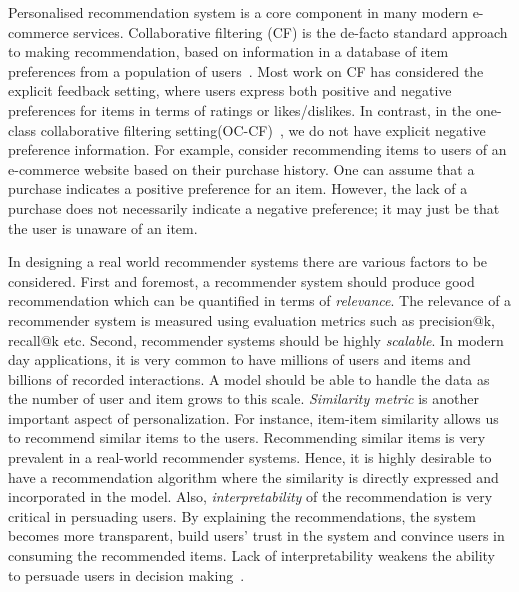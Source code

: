 Personalised recommendation system is a core component
in many modern e-commerce services. Collaborative
filtering (CF) is the de-facto standard approach to making recommendation,
based on information in a database
of item preferences from a population of users~\citep{Goldberg:1992}. Most work on CF has considered 
the explicit feedback
setting, where users express both positive and negative preferences
for items in terms of ratings or likes/dislikes. In
contrast, in the one-class collaborative filtering setting(OC-CF)~\citep{Pan:2008}, we do not have
explicit negative preference information. For example, consider
recommending items to users of an e-commerce website
based on their purchase history. One can assume that a
purchase indicates a positive preference for an item. However,
the lack of a purchase does not necessarily indicate
a negative preference; it may just be that the user is unaware
of an item. 



In designing a real world recommender systems there are various factors to be 
considered. First and foremost, a recommender system should  produce good recommendation which can be quantified in terms of \textsl{relevance}. The relevance of a recommender system is measured using evaluation metrics such as \textsf{precision@k}, \textsf{recall@k} etc. Second, recommender systems should be highly \textsl{scalable}. In modern day applications, it is very common to have millions of users and items and billions of recorded interactions. A model should be able to handle the data as the number of user and item grows to this scale. \textsl{Similarity metric} is another important aspect of personalization. For instance, item-item similarity allows us to recommend similar items to the users. Recommending similar items is very prevalent in a real-world recommender systems. Hence, it is highly desirable to have a recommendation algorithm where the similarity is directly expressed and incorporated in the model. Also, \textsl{interpretability} of the recommendation is very critical in persuading users. By explaining the recommendations, the system becomes more transparent, build users' trust in the system and convince users in consuming the recommended items. Lack of interpretability weakens the ability to persuade users in decision making~\citep{explainabiltyVIG2009}.

